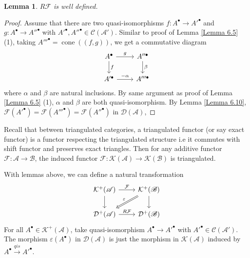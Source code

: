 \documentclass{ctexart}
\newtheorem{lemma}{Lemma}[section]
\newcommand{\cone}{\operatorname{cone}}
\begin{document}
\begin{lemma}
    $R\mathcal{F}$ is well defined.
    \label{Lemma 6.11}
\end{lemma}
\begin{proof}
    Assume that there are two quasi-isomorphisms $f: A^{\bullet} \rightarrow A'^{\bullet}$ and $g: A^{\bullet} \rightarrow A''^{\bullet}$ with $A'^{\bullet},A''^{\bullet}\in \mathcal{C}(\mathscr{A}')$.
    Similar to proof of Lemma \ref{Lemma 6.5} (1), taking $A'''^{\bullet} = \cone((f, g))$, we get a commutative diagram
    \begin{equation}
        \begin{tikzcd}
            A^{\bullet} \arrow[r, "g"] \arrow[d, "f"] &
            A''^{\bullet} \arrow[d, "\beta"] \\
            A'^{\bullet} \arrow[r, "-\alpha"] &
            A'''^{\bullet} 
        \end{tikzcd}
    \end{equation}
    where $\alpha$ and $\beta$ are natural inclusions.
    By same argument as proof of Lemma \ref{Lemma 6.5} (1), $\alpha$ and $\beta$ are both quasi-isomorphism.
    By Lemma \ref{Lemma 6.10}, $\mathcal{F}(A'^{\bullet}) = \mathcal{F}(A'''^{\bullet}) = \mathcal{F}(A''^{\bullet})$ in $\mathcal{D}(\mathscr{A})$,
\end{proof}
Recall that between triangulated categories, a triangulated functor (or say exact functor) is a functor respecting the triangulated structure i.e it commutes with shift functor and preserves exact triangles.
Then for any additive functor $\mathcal{F}: \mathscr{A} \rightarrow \mathscr{B}$, the induced functor $\mathcal{F}: \mathcal{K}(\mathscr{A}) \rightarrow \mathcal{K}(\mathscr{B})$ is triangulated.
\par
With lemmas above, we can define a natural transformation
\begin{equation}
    \begin{tikzcd}
        \mathcal{K}^{+}(\mathscr{A}) \arrow[r, "\mathcal{F}"] \arrow[d] &
        \mathcal{K}^{+}(\mathscr{B}) \arrow[d] \arrow[dl, Rightarrow, "\varepsilon" swap] \\
        \mathcal{D}^{+}(\mathscr{A}) \arrow[r, "R\mathcal{F}"] &
        \mathcal{D}^{+}(\mathscr{B})
    \end{tikzcd}
\end{equation}
For all $A^{\bullet}\in \mathcal{K}^{+}(\mathscr{A})$, take quasi-isomorphism $A^{\bullet} \rightarrow A'^{\bullet}$ with $A'^{\bullet}\in \mathcal{C}(\mathscr{A}')$.
The morphism $\varepsilon(A^{\bullet})$ in $\mathcal{D}(\mathscr{A})$ is just the morphism in $\mathcal{K}(\mathscr{A})$ induced by $A^{\bullet} \overset{qis}{\rightarrow} A'^{\bullet}$.
\end{document}

